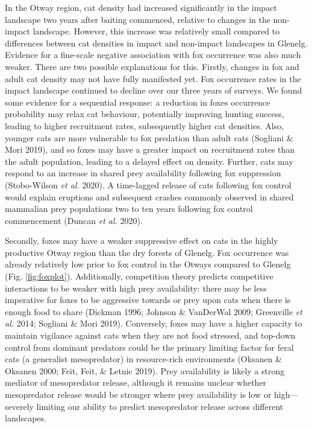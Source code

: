 \documentclass[preprint, 3p, authoryear]{elsarticle} %
\begin{document}
In the Otway region, cat density had increased significantly in the impact landscape two years after baiting commenced, relative to changes in the non-impact landscape. However, this increase was relatively small compared to differences between cat densities in impact and non-impact landscapes in Glenelg. Evidence for a fine-scale negative association with fox occurrence was also much weaker. There are two possible explanations for this. Firstly, changes in fox and adult cat density may not have fully manifested yet. Fox occurrence rates in the impact landscape continued to decline over our three years of surveys. We found some evidence for a sequential response: a reduction in foxes occurrence probability may relax cat behaviour, potentially improving hunting success, leading to higher recruitment rates, subsequently higher cat densities. Also, younger cats are more vulnerable to fox predation than adult cats (Sogliani \& Mori 2019), and so foxes may have a greater impact on recruitment rates than the adult population, leading to a delayed effect on density. Further, cats may respond to an increase in shared prey availability following fox suppression (Stobo-Wilson \emph{et al.} 2020). A time-lagged release of cats following fox control would explain eruptions and subsequent crashes commonly observed in shared mammalian prey populations two to ten years following fox control commencement (Duncan \emph{et al.} 2020).

Secondly, foxes may have a weaker suppressive effect on cats in the highly productive Otway region than the dry forests of Glenelg. Fox occurrence was already relatively low prior to fox control in the Otways compared to Glenelg (Fig. \ref{fig:foxplot}). Additionally, competition theory predicts competitive interactions to be weaker with high prey availability: there may be less imperative for foxes to be aggressive towards or prey upon cats when there is enough food to share (Dickman 1996; Johnson \& VanDerWal 2009; Greenville \emph{et al.} 2014; Sogliani \& Mori 2019). Conversely, foxes may have a higher capacity to maintain vigilance against cats when they are not food stressed, and top-down control from dominant predators could be the primary limiting factor for feral cats (a generalist mesopredator) in resource-rich environments (Oksanen \& Oksanen 2000; Feit, Feit, \& Letnic 2019). Prey availability is likely a strong mediator of mesopredator release, although it remains unclear whether mesopredator release would be stronger where prey availability is low or high---severely limiting our ability to predict mesopredator release across different landscapes.
\end{document}
